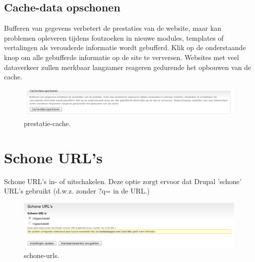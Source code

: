 \subsection{Cache-data opschonen} 
Bufferen van gegevens verbetert de prestaties van de website, maar kan problemen
opleveren tijdens foutzoeken in nieuwe modules, templates of vertalingen als verouderde informatie wordt gebufferd. 
Klik op de onderstaande knop om alle gebufferde informatie op de site te verversen. Websites met veel dataverkeer zullen 
merkbaar langzamer reageren gedurende het opbouwen van de cache.
\begin{figure}[!h]
    \centering
   \includegraphics[scale=0.3,angle=0]{prestatie-cache}
   \caption{prestatie-cache.\label{white}}
 \end{figure}
 
\section{Schone URL's} 
    Schone URL's in- of uitschakelen. Deze optie zorgt ervoor dat Drupal
    'schone' URL's gebruikt (d.w.z. zonder ?q= in de URL.) 
\begin{figure}[!h]
    \centering
   \includegraphics[scale=0.3,angle=0]{schone-urls}
   \caption{schone-urls.\label{white}}
 \end{figure}

